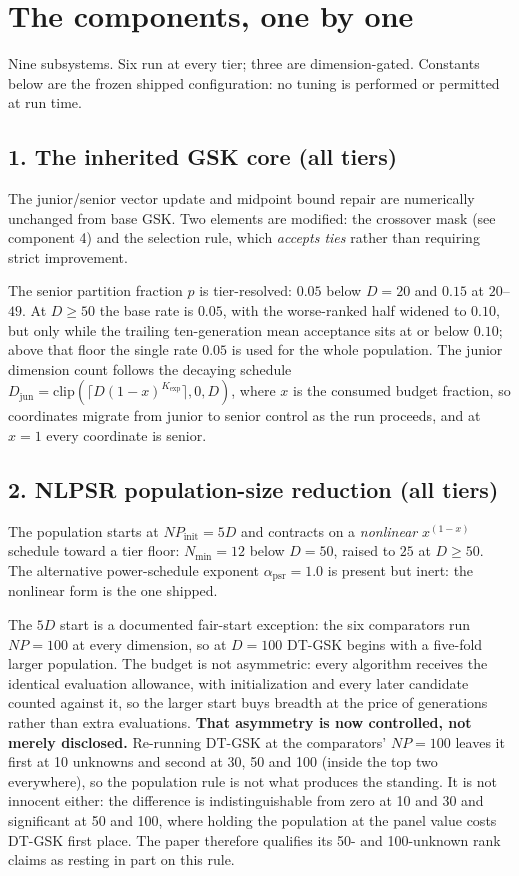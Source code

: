 \documentclass[11pt,a4paper]{article}
\newcommand{\hl}[1]{\textbf{#1}}
\begin{document}
\section{The components, one by one}

Nine subsystems. Six run at every tier; three are dimension-gated. Constants
below are the frozen shipped configuration: no tuning is performed or
permitted at run time.

\subsection{1. The inherited GSK core (all tiers)}

The junior/senior vector update and midpoint bound repair are numerically
unchanged from base GSK. Two elements are modified: the crossover mask (see
component 4) and the selection rule, which \emph{accepts ties} rather than
requiring strict improvement.

The senior partition fraction $p$ is tier-resolved: $0.05$ below $D=20$ and
$0.15$ at $20$--$49$. At $D\geq50$ the base rate is $0.05$, with the
worse-ranked half widened to $0.10$, but only while the trailing
ten-generation mean acceptance sits at or below $0.10$; above that floor the
single rate $0.05$ is used for the whole population. The junior
dimension count follows the decaying schedule
$D_{\mathrm{jun}} = \mathrm{clip}(\lceil D(1-x)^{K_{\exp}}\rceil, 0, D)$, where
$x$ is the consumed budget fraction, so coordinates migrate from junior to
senior control as the run proceeds, and at $x=1$ every coordinate is senior.

\subsection{2. NLPSR population-size reduction (all tiers)}

The population starts at $NP_{\mathrm{init}} = 5D$ and contracts on a
\emph{nonlinear} $x^{(1-x)}$ schedule toward a tier floor: $N_{\min} = 12$
below $D=50$, raised to $25$ at $D\geq50$. The alternative power-schedule
exponent $\alpha_{\mathrm{psr}} = 1.0$ is present but inert: the nonlinear
form is the one shipped.

The $5D$ start is a documented fair-start exception: the six comparators run
$NP = 100$ at every dimension, so at $D = 100$ DT-GSK begins with a five-fold
larger population. The budget is not asymmetric: every algorithm receives the
identical evaluation allowance, with initialization and every later candidate
counted against it, so the larger start buys breadth at the price of
generations rather than extra evaluations. \hl{That asymmetry is now
controlled, not merely disclosed.} Re-running DT-GSK at the comparators' $NP = 100$ leaves it first at
10 unknowns and second at 30, 50 and 100 (inside the top two everywhere), so
the population rule is not what produces the standing. It is not innocent
either: the difference is indistinguishable from zero at 10 and 30 and
significant at 50 and 100, where holding the population at the panel value costs
DT-GSK first place. The paper therefore qualifies its 50- and 100-unknown rank
claims as resting in part on this rule.
\end{document}
